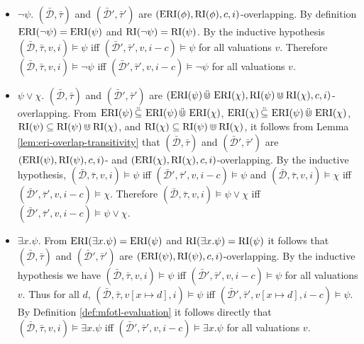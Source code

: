 \begin{itemize}
    \item 
        $\neg \psi$. 
        $(\bar{\mathcal{D}}, \bar{\tau})$ and $(\bar{\mathcal{D}}', \bar{\tau}')$ are $(\operatorname{ERI}(\phi), \operatorname{RI}(\phi), c, i)$-overlapping.
        By definition $\operatorname{ERI}(\neg \psi) = \operatorname{ERI}(\psi)$ and $\operatorname{RI}(\neg \psi) = \operatorname{RI}(\psi)$.
        By the inductive hypothesis $(\bar{\mathcal{D}}, \bar{\tau}, v, i) \models \psi$ iff $(\bar{\mathcal{D}}', \bar{\tau}', v, i-c) \models \psi$ for all valuations $v$.
        Therefore $(\bar{\mathcal{D}}, \bar{\tau}, v, i) \models \neg \psi$ iff $(\bar{\mathcal{D}}', \bar{\tau}', v, i-c) \models \neg \psi$ for all valuations $v$.

    \item 
        $\psi \lor \chi$.
        $(\bar{\mathcal{D}}, \bar{\tau})$ and $(\bar{\mathcal{D}}', \bar{\tau}')$ are $(\operatorname{ERI}(\psi) \,\ddot{\Cup}\, \operatorname{ERI}(\chi), \operatorname{RI}(\psi) \Cup \operatorname{RI}(\chi), c, i)$-overlapping.
        From $\operatorname{ERI}(\psi) \,\ddot{\subseteq}\, \operatorname{ERI}(\psi) \,\ddot{\Cup}\, \operatorname{ERI}(\chi)$, $\operatorname{ERI}(\chi) \,\ddot{\subseteq}\, \operatorname{ERI}(\psi) \,\ddot{\Cup}\, \operatorname{ERI}(\chi)$, $\operatorname{RI}(\psi) \subseteq \operatorname{RI}(\psi) \Cup \operatorname{RI}(\chi)$, and $\operatorname{RI}(\chi) \subseteq \operatorname{RI}(\psi) \Cup \operatorname{RI}(\chi)$,
            it follows from Lemma \ref{lem:eri-overlap-transitivity} that $(\bar{\mathcal{D}}, \bar{\tau})$ and $(\bar{\mathcal{D}}', \bar{\tau}')$ are $(\operatorname{ERI}(\psi), \operatorname{RI}(\psi), c, i)$- and $(\operatorname{ERI}(\chi), \operatorname{RI}(\chi), c, i)$-overlapping.
        By the inductive hypothesis, $(\bar{\mathcal{D}}, \bar{\tau}, v, i) \models \psi$ iff $(\bar{\mathcal{D}}', \bar{\tau}', v, i-c) \models \psi$ and $(\bar{\mathcal{D}}, \bar{\tau}, v, i) \models \chi$ iff $(\bar{\mathcal{D}}', \bar{\tau}', v, i-c) \models \chi$.
        Therefore $(\bar{\mathcal{D}}, \bar{\tau}, v, i) \models \psi \lor \chi$ iff $(\bar{\mathcal{D}}', \bar{\tau}', v, i-c) \models \psi \lor \chi$.
        
    \item 
        $\exists x. \psi$.
        From $\operatorname{ERI}(\exists x. \psi) = \operatorname{ERI}(\psi)$ and $\operatorname{RI}(\exists x. \psi) = \operatorname{RI}(\psi)$ it follows that $(\bar{\mathcal{D}}, \bar{\tau})$ and $(\bar{\mathcal{D}}', \bar{\tau}')$ are $(\operatorname{ERI}(\psi), \operatorname{RI}(\psi), c, i)$-overlapping.
        By the inductive hypothesis we have $(\bar{\mathcal{D}}, \bar{\tau}, v, i) \models \psi$ iff $(\bar{\mathcal{D}}', \bar{\tau}', v, i-c) \models \psi$ for all valuations $v$.
        Thus for all $d$, $(\bar{\mathcal{D}}, \bar{\tau}, v[x \mapsto d], i) \models \psi$ iff $(\bar{\mathcal{D}}', \bar{\tau}', v[x \mapsto d], i-c) \models \psi$.
        By Definition \ref{def:mfotl-evaluation} it follows directly that $(\bar{\mathcal{D}}, \bar{\tau}, v, i) \models \exists x. \psi$ iff $(\bar{\mathcal{D}}', \bar{\tau}', v, i-c) \models \exists x. \psi$ for all valuations $v$.


\end{itemize}
